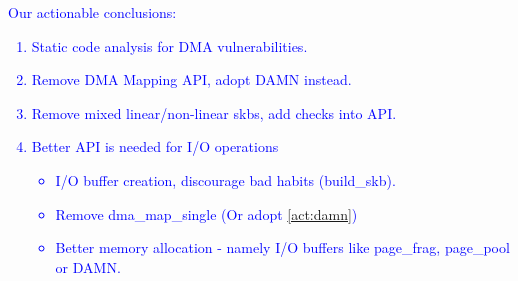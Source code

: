 \textcolor{blue}{
Our actionable conclusions:
\begin{enumerate}
    \item Static code analysis for DMA vulnerabilities.
    \item Remove DMA Mapping API, adopt DAMN instead. \label{act:damn}
    \item Remove mixed linear/non-linear skbs, add checks into \shinfo API.
    \item Better API is needed for I/O operations
    \begin{itemize}
        \item I/O buffer creation, discourage bad habits (build\_skb).
        \item Remove dma\_map\_single (Or adopt \ref{act:damn})
        \item Better memory allocation - namely I/O buffers like page\_frag, page\_pool or DAMN.
    \end{itemize}
\end{enumerate}
}